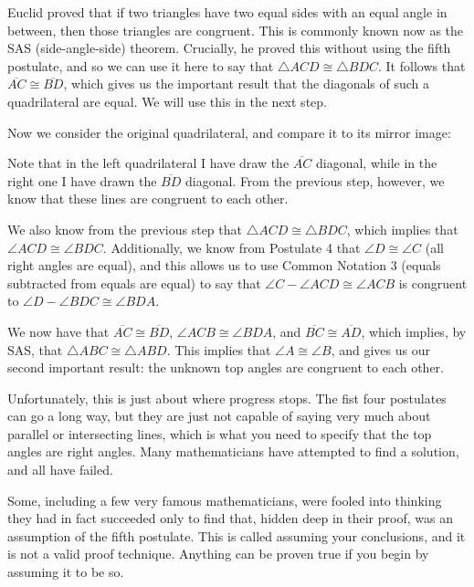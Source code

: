 \documentclass[12pt]{article}
\begin{document}
Euclid proved that if two triangles have two equal sides with an equal angle in between, then those triangles are congruent. This is commonly known now as the SAS (side-angle-side) theorem. Crucially, he proved this without using the fifth postulate, and so we can use it here to say that $\triangle ACD\cong\triangle BDC$. It follows that $\overline{AC}\cong\overline{BD}$, which gives us the important result that the diagonals of such a quadrilateral are equal. We will use this in the next step.

Now we consider the original quadrilateral, and compare it to its mirror image:

\begin{quads}[scale=.75]
\saccheriquad[shift=-4, lrdiag]
\saccheriquad[shift=4, name=BADC, lrdiag]
\end{quads}

Note that in the left quadrilateral I have draw the $\overline{AC}$ diagonal, while in the right one I have drawn the $\overline{BD}$ diagonal. From the previous step, however, we know that these lines are congruent to each other.

We also know from the previous step that $\triangle ACD\cong\triangle BDC$, which implies that $\angle ACD\cong\angle BDC$. Additionally, we know from Postulate 4 that $\angle D\cong\angle C$ (all right angles are equal), and this allows us to use Common Notation 3 (equals subtracted from equals are equal) to say that $\angle C-\angle ACD\cong\angle ACB$ is congruent to $\angle D-\angle BDC\cong\angle BDA$.

We now have that $\overline{AC}\cong\overline{BD}$, $\angle ACB\cong\angle BDA$, and $\overline{BC}\cong\overline{AD}$, which implies, by SAS, that $\triangle ABC\cong\triangle ABD$. This implies that $\angle A\cong\angle B$, and gives us our second important result: the unknown top angles are congruent to each other.

Unfortunately, this is just about where progress stops. The fist four postulates can go a long way, but they are just not capable of saying very much about parallel or intersecting lines, which is what you need to specify that the top angles are right angles. Many mathematicians have attempted to find a solution, and all have failed.

Some, including a few very famous mathematicians, were fooled into thinking they had in fact succeeded only to find that, hidden deep in their proof, was an assumption of the fifth postulate. This is called assuming your conclusions, and it is not a valid proof technique. Anything can be proven true if you begin by assuming it to be so.
\end{document}
